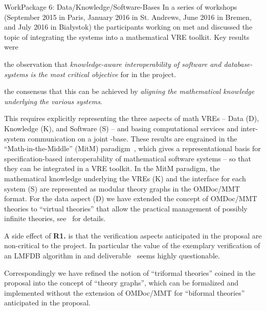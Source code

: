 \documentclass{deliverablereport}
\makeatletter
\renewcommand\subsubsection{\@startsection{subsubsection}{2}%
  \z@{.5\linespacing\@plus.7\linespacing}{.1\linespacing}%
  {\normalfont\bfseries}}
\makeatother
\begin{document}
\clearpage
  \subsubsection{WorkPackage 6:  Data/Knowledge/Software-Bases}
  In a series of workshops (September 2015 in Paris, January 2016 in St. Andrews, June
  2016 in Bremen, and July 2016 in Bia{\l}ystok) the participants working on
   met and discussed the topic of integrating the \pn systems into a
  mathematical VRE toolkit.  Key results were
  \begin{compactitem}[\bf R1.]
  \item the observation that \emph{knowledge-aware interoperability of software and
      database-systems is the most critical objective} for  in the \pn
    project.
  \item the consensus that this can be achieved by \emph{aligning the mathematical
      knowledge underlying the various systems}.
  \end{compactitem}
  This requires explicitly representing the three aspects of math VREs -- Data (D),
  Knowledge (K), and Software (S) -- and basing computational services and inter-system
  communication on a joint \DKS-base. These results are engrained in the
  ``Math-in-the-Middle'' (MitM) paradigm~\cite{DehKohKon:iop16}, which gives a
  representational basis for specification-based interoperability of mathematical software
  systems -- so that they can be integrated in a VRE toolkit. In the MitM paradigm, the
  mathematical knowledge underlying the VREs (K) and the interface for each
  system (S) are represented as modular theory graphs in the OMDoc/MMT format. For the
  data aspect (D) we have extended the concept of OMDoc/MMT theories to ``virtual
  theories'' that allow the practical management of possibly infinite theories,
  see~\cite{ODK-D6.2} for details.

  A side effect of \textbf{R1.} is that the verification aspects anticipated in the
  proposal are non-critical to the \pn project. In particular the value of the exemplary
  verification of an LMFDB algorithm in  and
  deliverable~ seems highly questionable.

  Correspondingly we have refined the notion of ``triformal theories'' coined in the
  proposal into the concept of ``\DKS theory graphs'', which can be formalized and
  implemented without the extension of OMDoc/MMT for ``biformal theories'' anticipated in
  the proposal.
\end{document}
